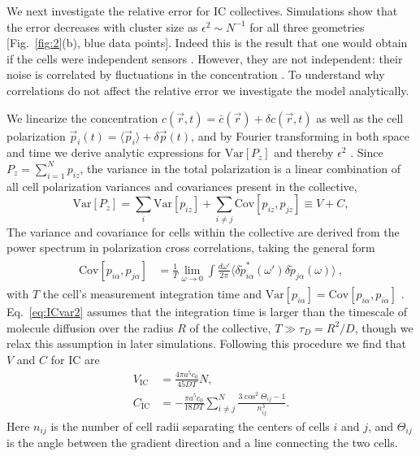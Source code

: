 We next investigate the relative error for IC collectives. Simulations show that the error decreases with cluster size as
$\epsilon^2 \sim N^{-1}$
for all three geometries [Fig.\ \ref{fig:2}(b), blue data points]. Indeed this is the result that one would obtain if the cells were independent sensors \cite{simons2004many}. However, they are not independent: their noise is correlated by fluctuations in the concentration \cite{fancher2016fundamental,mugler2016limits}. To understand why correlations do not affect the relative error we investigate the model analytically.

We linearize the concentration $c(\vec{r},t) = \bar{c}(\vec{r}) + \delta c(\vec{r},t)$ as well as the cell polarization
$\vec{p}_i(t) = \langle \vec{p}_i \rangle + \delta\vec{p}(t)$,
and by Fourier transforming in both space and time we derive analytic expressions for
$\text{Var}[P_z]$ and thereby $\epsilon^2$ \cite{supinfo}. Since
$P_z = \sum_{i=1}^N p_{iz}$,
the variance in the total polarization is a linear combination of all cell polarization variances and covariances present in the collective,
\begin{equation} \label{eq:ICvar1}
    \text{Var}[P_z] =
    \sum_{i} \text{Var}[p_{iz}]
    + \sum_{i\neq j} \text{Cov}[p_{iz},p_{jz}]
    \equiv V + C ,
\end{equation}
The variance and covariance for cells within the collective are derived from the power spectrum in polarization cross correlations, taking the general form
\begin{align} \label{eq:ICvar2}
\begin{split}
    \text{Cov}[p_{i\alpha},p_{j\alpha}] &= \frac{1}{T}
    \lim_{\omega \to 0} \int \frac{d\omega'}{2\pi}
    \langle\delta\tilde{p}_{i\alpha}^*(\omega')\delta\tilde{p}_{j\alpha}(\omega) \rangle
    \ ,
\end{split}
\end{align}
with $T$ the cell's measurement integration time and $\text{Var}[p_{i\alpha}] = \text{Cov}[p_{i\alpha},p_{i\alpha}]$ \cite{fancher2016fundamental,mugler2016limits,bialek2005physical}. Eq.\ \ref{eq:ICvar2} assumes that the integration time is larger than the timescale of molecule diffusion over the radius $R$ of the collective,
$T \gg \tau_D = R^2/D$, though we relax this assumption in later simulations.
Following this procedure we find that $V$ and $C$ for IC are \cite{supinfo}
\begin{align}
    V_\text{IC} &= \frac{4\pi a^5c_0}{45DT} N  \label{eq:ICV} , \\
    C_\text{IC} &= -\frac{\pi a^5c_0}{18DT} \sum_{i \neq j}^N \frac{3\cos^2\Theta_{ij}-1}{n^3_{ij}} . \label{eq:ICC}
\end{align}
Here
$n_{ij}$ %
is the number of cell radii separating the centers of cells $i$ and $j$, and $\Theta_{ij}$ is the angle between the gradient direction and a line connecting the two cells.


